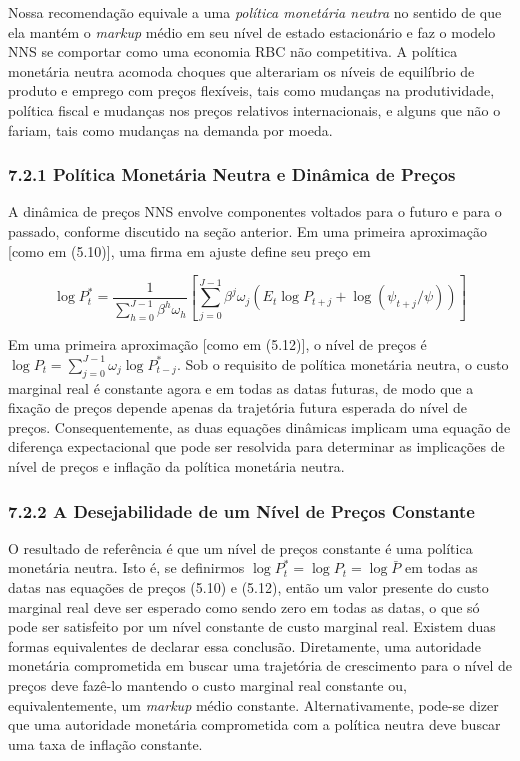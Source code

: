 \documentclass[12pt]{article}
\begin{document}
Nossa recomendação equivale a uma \textit{política monetária neutra} no sentido de que ela mantém o \textit{markup} médio em seu nível de estado estacionário e faz o modelo NNS se comportar como uma economia RBC não competitiva. A política monetária neutra acomoda choques que alterariam os níveis de equilíbrio de produto e emprego com preços flexíveis, tais como mudanças na produtividade, política fiscal e mudanças nos preços relativos internacionais, e alguns que não o fariam, tais como mudanças na demanda por moeda.

\subsubsection{7.2.1 Política Monetária Neutra e Dinâmica de Preços} A dinâmica de preços NNS envolve componentes voltados para o futuro e para o passado, conforme discutido na seção anterior. Em uma primeira aproximação [como em (5.10)], uma firma em ajuste define seu preço em

\begin{equation}
\log P_t^* = \frac{1}{\sum_{h=0}^{J-1} \beta^h \omega_h} \left[ \sum_{j=0}^{J-1} \beta^j \omega_j (E_t \log P_{t+j} + \log (\psi_{t+j}/\psi)) \right]
\end{equation}

Em uma primeira aproximação [como em (5.12)], o nível de preços é $\log P_t = \sum_{j=0}^{J-1} \omega_j \log P_{t-j}^*$. Sob o requisito de política monetária neutra, o custo marginal real é constante agora e em todas as datas futuras, de modo que a fixação de preços depende apenas da trajetória futura esperada do nível de preços. Consequentemente, as duas equações dinâmicas implicam uma equação de diferença expectacional que pode ser resolvida para determinar as implicações de nível de preços e inflação da política monetária neutra.

\subsubsection{7.2.2 A Desejabilidade de um Nível de Preços Constante} O resultado de referência é que um nível de preços constante é uma política monetária neutra. Isto é, se definirmos $\log P_t^* = \log P_t = \log \bar{P}$ em todas as datas nas equações de preços (5.10) e (5.12), então um valor presente do custo marginal real deve ser esperado como sendo zero em todas as datas, o que só pode ser satisfeito por um nível constante de custo marginal real. Existem duas formas equivalentes de declarar essa conclusão. Diretamente, uma autoridade monetária comprometida em buscar uma trajetória de crescimento para o nível de preços deve fazê-lo mantendo o custo marginal real constante ou, equivalentemente, um \textit{markup} médio constante. Alternativamente, pode-se dizer que uma autoridade monetária comprometida com a política neutra deve buscar uma taxa de inflação constante.
\end{document}

